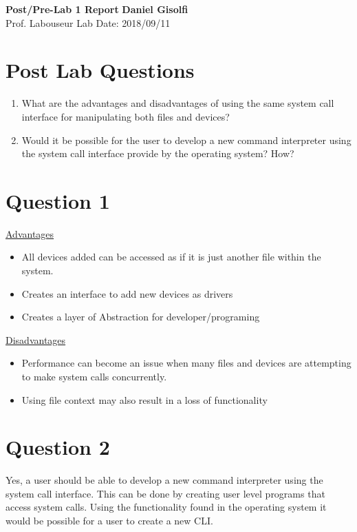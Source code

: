 \documentclass[a4paper, 11pt]{article}
\begin{document}
\noindent
\large\textbf{Post/Pre-Lab 1 Report} \hfill \textbf{Daniel Gisolfi} \\
Prof. Labouseur \hfill Lab Date: 2018/09/11\\

\section*{Post Lab Questions}

\begin{enumerate}
\item What are the advantages and disadvantages of using the same system call interface 
for manipulating both files and devices? 
\item Would it be possible for the user to develop a new command interpreter using the 
system call interface provide by the operating system? How?
\end{enumerate}

\section*{Question 1}

\underline{Advantages}
\begin{itemize}
\item All devices added can be accessed as if it is just another file within the system.
\item Creates an interface to add new devices as drivers
\item Creates a layer of Abstraction for developer/programing 
\end{itemize}
\underline{Disadvantages}
\begin{itemize}
\item Performance can become an issue when many files and devices are attempting to make system calls concurrently.
\item Using file context may also result in a loss of functionality
\end{itemize}



\section*{Question 2}

Yes, a user should be able to develop a new command interpreter using the system call interface.
This can be done by creating user level programs that access system calls. 
Using the functionality found in the operating system it would be possible for a user to create a new CLI.
\end{document}
